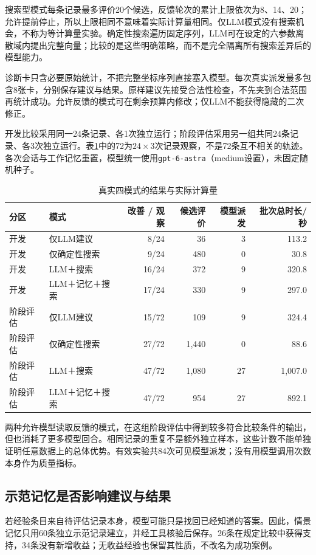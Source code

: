搜索型模式每条记录最多评价20个候选，反馈轮次的累计上限依次为8、14、20；允许提前停止，所以上限相同不意味着实际计算量相同。仅LLM模式没有搜索机会，不称为等计算量实验。确定性搜索遍历固定序列，LLM可在设定的六参数离散域内提出完整向量；比较的是这些明确策略，而不是完全隔离所有搜索差异后的模型能力。

诊断卡只含必要原始统计，不把完整坐标序列直接塞入模型。每次真实派发最多包含8张卡，分别保存建议与结果。原样建议先接受合法性检查，不先夹到合法范围再统计成功。允许反馈的模式可在剩余预算内修改；仅LLM不能获得隐藏的二次修正。

开发比较采用同一24条记录、各1次独立运行；阶段评估采用另一组共同24条记录、各3次独立运行。表\ref{tab:modes}中的72为$24\times3$次记录观察，不是72条互不相关的轨迹。各次会话与工作记忆重置，模型统一使用\texttt{gpt-6-astra}（medium设置），未固定随机种子。

\begin{table}[htbp]\centering\small
\caption{真实四模式的结果与实际计算量}\label{tab:modes}
\begin{tabular}{@{}llrrrr@{}}\toprule
分区 & 模式 & 改善 / 观察 & 候选评价 & 模型派发 & 批次总时长/秒\\\midrule
开发 & 仅LLM建议 & 8/24 & 36 & 3 & 113.2\\
开发 & 仅确定性搜索 & 9/24 & 480 & 0 & 30.8\\
开发 & LLM＋搜索 & 16/24 & 372 & 9 & 320.8\\
开发 & LLM＋记忆＋搜索 & 17/24 & 330 & 9 & 297.0\\\midrule
阶段评估 & 仅LLM建议 & 15/72 & 109 & 9 & 324.4\\
阶段评估 & 仅确定性搜索 & 27/72 & 1,440 & 0 & 88.6\\
阶段评估 & LLM＋搜索 & 47/72 & 1,080 & 27 & 1,007.0\\
阶段评估 & LLM＋记忆＋搜索 & 47/72 & 954 & 27 & 892.1\\\bottomrule
\end{tabular}
\end{table}

两种允许模型读取反馈的模式，在这组阶段评估中得到较多符合比较条件的输出，但也消耗了更多模型回合。相同记录的重复不是额外独立样本，这些计数不能单独证明任意数据上的总体优势。有效实验共84次可见模型派发；没有用模型调用次数本身作为质量指标。

\subsection{示范记忆是否影响建议与结果}
若经验条目来自待评估记录本身，模型可能只是找回已经知道的答案。因此，情景记忆只用60条独立示范记录建立，并经工具核验后保存。26条在规定比较中获得支持，34条没有新增收益；无收益经验也保留其性质，不改名为成功案例。

